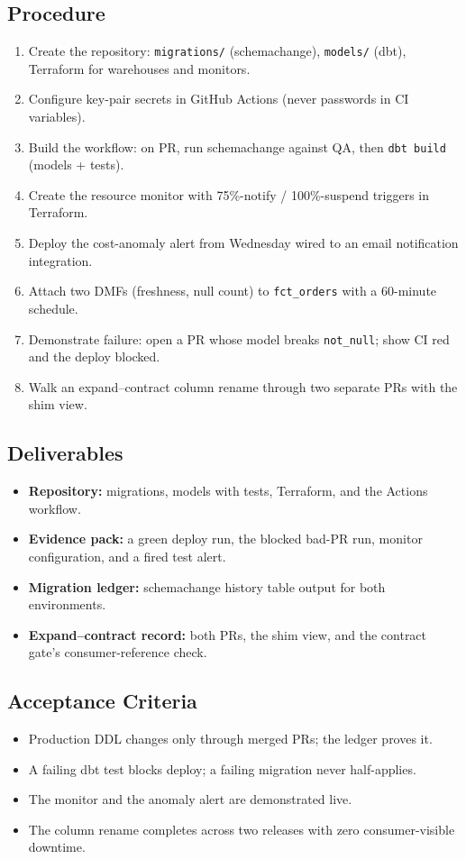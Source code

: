 \subsection*{Procedure}
\begin{enumerate}
    \item Create the repository: \texttt{migrations/} (schemachange), \texttt{models/} (dbt), Terraform for warehouses and monitors.
    \item Configure key-pair secrets in GitHub Actions (never passwords in CI variables).
    \item Build the workflow: on PR, run schemachange against QA, then \texttt{dbt build} (models + tests).
    \item Create the resource monitor with 75\%-notify / 100\%-suspend triggers in Terraform.
    \item Deploy the cost-anomaly alert from Wednesday wired to an email notification integration.
    \item Attach two DMFs (freshness, null count) to \texttt{fct\_orders} with a 60-minute schedule.
    \item Demonstrate failure: open a PR whose model breaks \texttt{not\_null}; show CI red and the deploy blocked.
    \item Walk an expand--contract column rename through two separate PRs with the shim view.
\end{enumerate}

\subsection*{Deliverables}
\begin{itemize}
    \item \textbf{Repository:} migrations, models with tests, Terraform, and the Actions workflow.
    \item \textbf{Evidence pack:} a green deploy run, the blocked bad-PR run, monitor configuration, and a fired test alert.
    \item \textbf{Migration ledger:} schemachange history table output for both environments.
    \item \textbf{Expand--contract record:} both PRs, the shim view, and the contract gate's consumer-reference check.
\end{itemize}

\subsection*{Acceptance Criteria}
\begin{itemize}
    \item Production DDL changes only through merged PRs; the ledger proves it.
    \item A failing dbt test blocks deploy; a failing migration never half-applies.
    \item The monitor and the anomaly alert are demonstrated live.
    \item The column rename completes across two releases with zero consumer-visible downtime.
\end{itemize}

